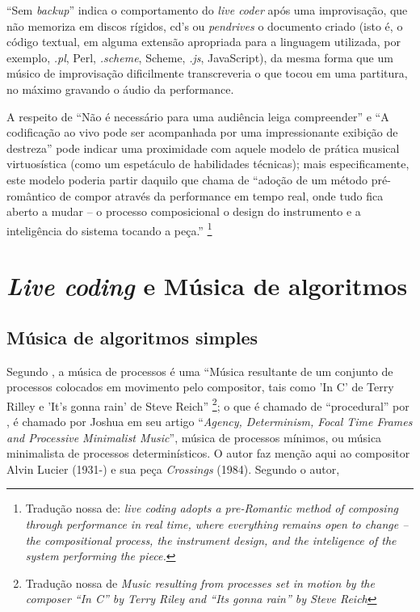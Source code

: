 ``Sem \emph{backup}'' indica o comportamento do \emph{live coder} após uma improvisação, que não memoriza em discos rígidos, cd's ou \emph{pendrives} o documento criado (isto é, o código textual, em alguma extensão apropriada para a linguagem utilizada, por exemplo, \emph{.pl}, Perl, \emph{.scheme}, Scheme, \emph{.js}, JavaScript), da mesma forma que um músico de improvisação dificilmente transcreveria o que tocou em uma partitura, no máximo gravando o áudio da performance.

A respeito de ``Não é necessário para uma audiência leiga compreender'' e ``A codificação ao vivo pode ser acompanhada por uma impressionante exibição de destreza'' pode indicar uma proximidade com aquele modelo de prática musical virtuosística (como um espetáculo de habilidades técnicas); mais especificamente, este modelo poderia partir daquilo que   chama de ``adoção de um método pré-romântico de compor através da performance em tempo real, onde tudo fica aberto a mudar -- o processo composicional o design do instrumento e a inteligência do sistema tocando a peça.'' \cite[p.~4]{magnusson_herding_2014}\footnote{Tradução nossa de: \emph{live coding adopts a pre-Romantic method of composing through performance in real time, where everything remains open to change -- the compositional process, the instrument design, and the inteligence of the system performing the piece.}}

\section{\emph{Live coding} e Música de algoritmos}

\subsection{Música de algoritmos simples}\label{sec:alg_simples}

Segundo , a música de processos é uma ``Música resultante de um conjunto de processos colocados em movimento pelo compositor, tais como  'In C' de Terry Rilley e 'It's gonna rain' de Steve Reich'' \footnote{Tradução nossa de \emph{Music resulting from processes set in motion by the composer “In C” by Terry Riley and “Its gonna rain” by Steve Reich}}; o que é chamado de ``procedural'' por , é chamado por Joshua  em seu artigo ``\emph{Agency, Determinism, Focal Time Frames and Processive Minimalist Music}'', música de processos mínimos, ou música minimalista de processos determinísticos. O autor faz menção aqui ao compositor Alvin Lucier (1931-) e sua peça \emph{Crossings} (1984). Segundo o autor,


